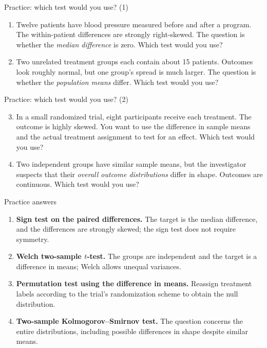 \documentclass[aspectratio=169,11pt]{beamer}
\begin{document}
\begin{frame}{Practice: which test would you use? (1)}
  \small
  \begin{enumerate}
    \item Twelve patients have blood pressure measured before and after a program.
      The within-patient differences are strongly right-skewed. The question is
      whether the \emph{median difference} is zero. Which test would you use?
    \vspace{5mm}
    \item Two unrelated treatment groups each contain about 15 patients.
      Outcomes look roughly normal, but one group's spread is much larger.
      The question is whether the \emph{population means} differ.
      Which test would you use?
  \end{enumerate}
\end{frame}

\begin{frame}{Practice: which test would you use? (2)}
  \small
  \begin{enumerate}
    \setcounter{enumi}{2}
    \item In a small randomized trial, eight participants receive each treatment.
      The outcome is highly skewed. You want to use the difference in sample means
      and the actual treatment assignment to test for an effect.
      Which test would you use?
    \vspace{5mm}
    \item Two independent groups have similar sample means, but the investigator
      suspects that their \emph{overall outcome distributions} differ in shape.
      Outcomes are continuous. Which test would you use?
  \end{enumerate}
\end{frame}
\begin{frame}{Practice answers}
  \small
  \begin{enumerate}
    \item \textbf{Sign test on the paired differences.}
      The target is the median difference, and the differences are strongly skewed;
      the sign test does not require symmetry.
    \vspace{2mm}
    \item \textbf{Welch two-sample \(t\)-test.}
      The groups are independent and the target is a difference in means;
      Welch allows unequal variances.
    \vspace{2mm}
    \item \textbf{Permutation test using the difference in means.}
      Reassign treatment labels according to the trial's randomization scheme
      to obtain the null distribution.
    \vspace{2mm}
    \item \textbf{Two-sample Kolmogorov--Smirnov test.}
      The question concerns the entire distributions, including possible
      differences in shape despite similar means.
  \end{enumerate}
\end{frame}
\end{document}
